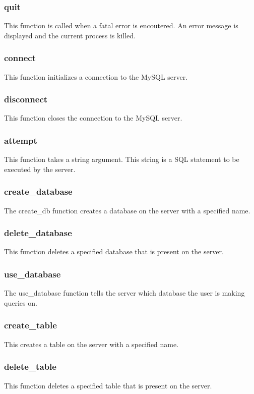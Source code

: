 \documentclass{article}
\begin{document}
\subsubsection*{quit}
This function is called when a fatal error is encoutered. An error message is displayed and the current process is killed.

\subsubsection*{connect}
This function initializes a connection to the MySQL server.

\subsubsection*{disconnect}
This function closes the connection to the MySQL server.

\subsubsection*{attempt}
This function takes a string argument. This string is a SQL statement to be executed by the server.

\subsubsection*{create\_database}
The create\_db function creates a database on the server with a specified name.

\subsubsection*{delete\_database}
This function deletes a specified database that is present on the server.

\subsubsection*{use\_database}
The use\_database function tells the server which database the user is making queries on.

\subsubsection*{create\_table}
This creates a table on the server with a specified name.

\subsubsection*{delete\_table}
This function deletes a specified table that is present on the server.
\end{document}

